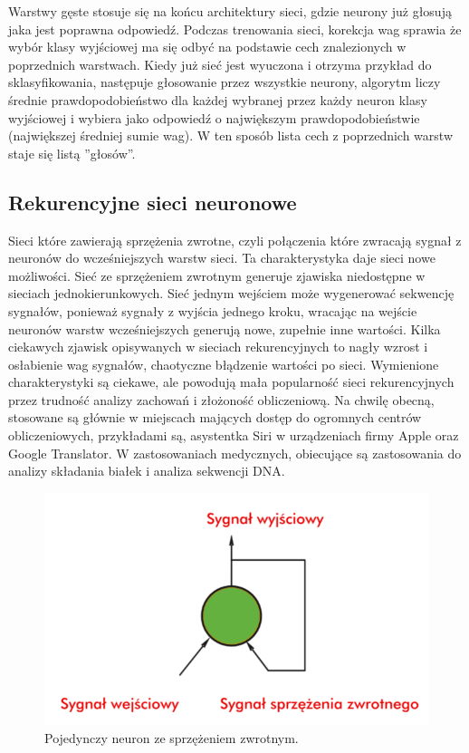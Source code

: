 \documentclass[12pt,a4paper,twoside,titlepage,openright]{book}
\begin{document}
Warstwy gęste stosuje się na końcu architektury sieci, gdzie neurony już głosują jaka jest poprawna odpowiedź. Podczas trenowania sieci, korekcja wag sprawia że wybór klasy wyjściowej ma się odbyć na podstawie cech znalezionych w poprzednich warstwach. Kiedy już sieć jest wyuczona i otrzyma przykład do sklasyfikowania, następuje głosowanie przez wszystkie neurony, algorytm liczy średnie prawdopodobieństwo dla każdej wybranej przez każdy neuron klasy wyjściowej i wybiera jako odpowiedź o największym prawdopodobieństwie (największej średniej sumie wag). W ten sposób lista cech z poprzednich warstw staje się listą ''głosów''.

\subsection{Rekurencyjne sieci neuronowe}
Sieci które zawierają sprzężenia zwrotne, czyli połączenia które zwracają sygnał z neuronów do wcześniejszych warstw sieci. Ta charakterystyka daje sieci nowe możliwości. Sieć ze sprzężeniem zwrotnym generuje zjawiska niedostępne w sieciach jednokierunkowych. Sieć jednym wejściem może wygenerować sekwencję sygnałów, ponieważ sygnały z wyjścia jednego kroku, wracając na wejście neuronów warstw wcześniejszych generują nowe, zupełnie inne wartości. Kilka ciekawych zjawisk opisywanych w sieciach rekurencyjnych to nagły wzrost i osłabienie wag sygnałów, chaotyczne błądzenie wartości po sieci. Wymienione charakterystyki są ciekawe, ale powodują mała popularność sieci rekurencyjnych przez trudność analizy zachowań i złożoność obliczeniową. Na chwilę obecną, stosowane są głównie w miejscach mających dostęp do ogromnych centrów obliczeniowych, przykładami są, asystentka Siri w urządzeniach firmy Apple oraz Google Translator. W zastosowaniach medycznych, obiecujące są zastosowania do analizy składania białek i analiza sekwencji DNA.

\begin{figure}[ht]
	\centering
			\includegraphics[resolution=100, scale=0.5]{recurrentNeuralNetwork.png}
		\caption{Pojedynczy neuron ze sprzężeniem zwrotnym.}
\end{figure}
\end{document}
